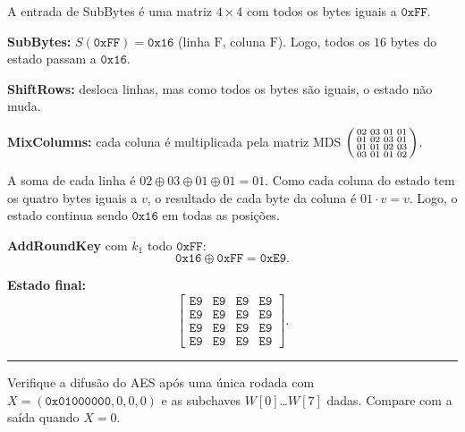 \documentclass[12pt,a4paper]{article}
\newcommand{\exercicio}[1]{%
    \par\vspace{1.2em}
    \noindent
    {\color{black!55}\rule[-0.25em]{3pt}{1.6em}}%
    \hspace{0.6em}{\Large\bfseries Exerc\'{i}cio #1}
    \par\vspace{-0.4em}
    \noindent{\color{black!35}\rule{\textwidth}{0.4pt}}
    \par\vspace{0.35em}
}
\newenvironment{resposta}{%
    \begin{respostabox}
    \color{red!70!black}\sloppy
}{%
    \end{respostabox}
}
\begin{document}
\begin{resposta}

A entrada de SubBytes é uma matriz $4{\times}4$ com todos os bytes iguais a $\texttt{0xFF}$.

\textbf{SubBytes:} $S(\texttt{0xFF}) = \texttt{0x16}$ (linha $\mathrm{F}$, coluna $\mathrm{F}$). Logo, todos os $16$ bytes do estado passam a $\texttt{0x16}$.

\textbf{ShiftRows:} desloca linhas, mas como todos os bytes são iguais, o estado não muda.

\textbf{MixColumns:} cada coluna é multiplicada pela matriz MDS
$\begin{psmallmatrix}02 & 03 & 01 & 01\\01 & 02 & 03 & 01\\01 & 01 & 02 & 03\\03 & 01 & 01 & 02\end{psmallmatrix}$.

A soma de cada linha é $02 \oplus 03 \oplus 01 \oplus 01 = 01$. Como cada coluna do estado tem os quatro bytes iguais a $v$, o resultado de cada byte da coluna é $01 \cdot v = v$. Logo, o estado continua sendo $\texttt{0x16}$ em todas as posições.

\textbf{AddRoundKey} com $k_1$ todo $\texttt{0xFF}$:
\[
\texttt{0x16} \oplus \texttt{0xFF} = \texttt{0xE9}.
\]

\textbf{Estado final:}
\[
\begin{bmatrix}
\texttt{E9} & \texttt{E9} & \texttt{E9} & \texttt{E9}\\
\texttt{E9} & \texttt{E9} & \texttt{E9} & \texttt{E9}\\
\texttt{E9} & \texttt{E9} & \texttt{E9} & \texttt{E9}\\
\texttt{E9} & \texttt{E9} & \texttt{E9} & \texttt{E9}
\end{bmatrix}.
\]

\end{resposta}

\exercicio{7}
Verifique a difusão do AES após uma única rodada com $X = (\texttt{0x01000000}, 0, 0, 0)$ e as subchaves $W[0]$\ldots$W[7]$ dadas. Compare com a saída quando $X = 0$.
\end{document}
